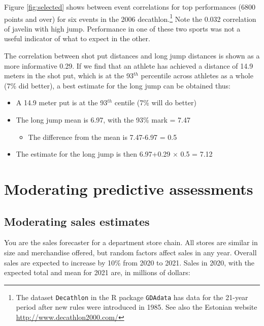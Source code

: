 \documentclass[
  10pt,
  b5paper]{book}
\providecommand{\tightlist}{%
  \setlength{\itemsep}{0pt}\setlength{\parskip}{0pt}}
\begin{document}
Figure \ref{fig:selected} shows between event correlations for top performances (6800 points and over) for six events in the 2006 decathlon.\footnote{The dataset \texttt{Decathlon} in the R package \texttt{GDAdata} has data for the 21-year period after new rules were introduced in 1985. See also the Estonian website \url{http://www.decathlon2000.com/}} Note the 0.032 correlation of javelin with high jump. Performance in one of these two sports was not a useful indicator of what to expect in the other.

The correlation between shot put distances and long jump distances is shown as a more informative 0.29. If we find that an athlete has achieved a distance of 14.9 meters in the shot put, which is at the 93\(^{th}\) percentile across athletes as a whole (7\% did better), a best estimate for the long jump can be obtained thus:

\begin{itemize}
\tightlist
\item
  A 14.9 meter put is at the 93\(^{th}\) centile (7\% will do better)
\item
  The long jump mean is 6.97, with the 93\% mark = 7.47

  \begin{itemize}
  \tightlist
  \item
    The difference from the mean is 7.47-6.97 = 0.5
  \end{itemize}
\item
  The estimate for the long jump is then 6.97+0.29 \(\times\) 0.5 = 7.12
\end{itemize}

\hypertarget{moderating-predictive-assessments}{%
\section{Moderating predictive assessments}\label{moderating-predictive-assessments}}

\hypertarget{moderating-sales-estimates}{%
\subsection*{Moderating sales estimates}\label{moderating-sales-estimates}}

You are the sales forecaster for a department store chain. All stores are similar in size and merchandise offered, but random factors affect sales in any year. Overall sales are expected to increase by 10\% from 2020 to 2021. Sales in 2020, with the expected total and mean for 2021 are, in millions of dollars:
\end{document}
